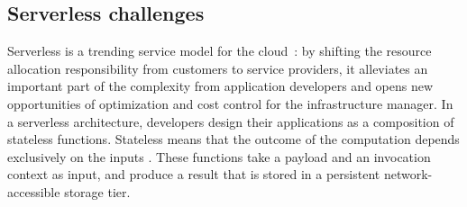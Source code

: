 

\subsection{Serverless challenges}

Serverless is a trending service model for the cloud~\cite{Lannurien2023}: by shifting the resource allocation responsibility from customers to service providers, it alleviates an important part of the complexity from application developers and opens new opportunities of optimization and cost control for the infrastructure manager.
In a serverless architecture, developers design their applications as a composition of stateless functions. Stateless %
means that the outcome of the computation depends exclusively on the inputs \cite{burckhardtNetheriteEfficientExecution}. These functions take a payload and an invocation context as input, and produce a result that is stored in a persistent network-accessible storage tier. %

